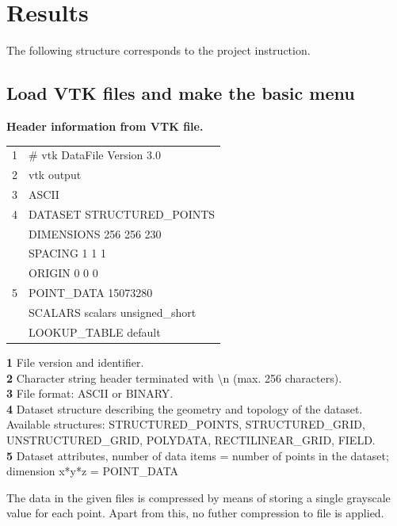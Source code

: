 \chapter{Results}
The following structure corresponds to the project instruction.


\section{Load VTK files and make the basic menu} 

\textbf{Header information from VTK file.}

\begin{table}[h]
	\ttfamily
	\small
	\begin{tabular}{l|l}
		1 & \# vtk DataFile Version 3.0     \\
		2 & vtk output                      \\
		3 & ASCII                           \\
		4 & DATASET STRUCTURED\_POINTS      \\
		& DIMENSIONS 256 256 230          \\
		& SPACING 1 1 1                   \\
		& ORIGIN 0 0 0                    \\
		5 & POINT\_DATA 15073280            \\
		& SCALARS scalars unsigned\_short \\
		& LOOKUP\_TABLE default          
	\end{tabular}
\end{table}

\noindent
\textbf{1} File version and identifier.\\
\textbf{2} Character string header terminated with \textbackslash n (max. 256 characters).\\
\textbf{3} File format: ASCII or BINARY.\\
\textbf{4} Dataset structure describing the geometry and topology of the dataset. Available structures: STRUCTURED\_POINTS, STRUCTURED\_GRID, UNSTRUCTURED\_GRID, POLYDATA, RECTILINEAR\_GRID, FIELD.\\
\textbf{5} Dataset attributes, number of data items = number of points in the dataset; dimension x*y*z = POINT\_DATA

The data in the given files is compressed by means of storing a single grayscale value for each point. Apart from this, no futher compression to file is applied.


